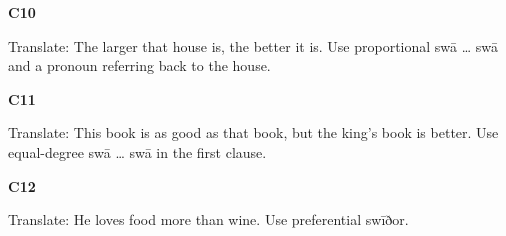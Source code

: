 \par\begin{minipage}{\linewidth}\raggedright
\textbf{C10}

Translate: The larger that house is, the better it is. Use proportional swā … swā and a pronoun referring back to the house.

\end{minipage}\par\addvspace{4pt}

\par\begin{minipage}{\linewidth}\raggedright
\textbf{C11}

Translate: This book is as good as that book, but the king’s book is better. Use equal-degree swā … swā in the first clause.

\end{minipage}\par\addvspace{4pt}

\par\begin{minipage}{\linewidth}\raggedright
\textbf{C12}

Translate: He loves food more than wine. Use preferential swīðor.

\end{minipage}\par\addvspace{4pt}

